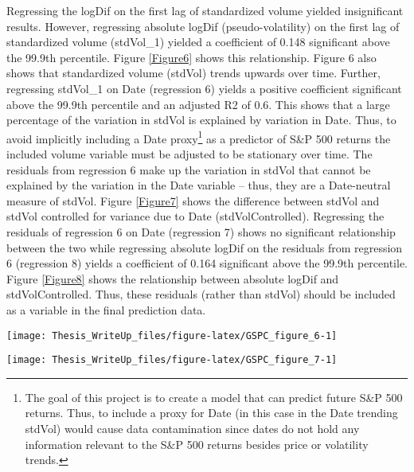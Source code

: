 \documentclass[11pt,preprint, authoryear]{elsarticle}
\let\origfigure\figure
\let\endorigfigure\endfigure
\renewenvironment{figure}[1][2] {
    \expandafter\origfigure\expandafter[H]
} {
    \endorigfigure
}
\numberwithin{equation}{section}
\numberwithin{figure}{section}
\numberwithin{table}{section}
\let\rmarkdownfootnote\footnote%
\def\footnote{\protect\rmarkdownfootnote}
\begin{document}
Regressing the logDif on the first lag of standardized volume yielded
insignificant results. However, regressing absolute logDif
(pseudo-volatility) on the first lag of standardized volume (stdVol\_1)
yielded a coefficient of 0.148 significant above the 99.9th percentile.
Figure \ref{Figure6} shows this relationship. Figure 6 also shows that
standardized volume (stdVol) trends upwards over time. Further,
regressing stdVol\_1 on Date (regression 6) yields a positive
coefficient significant above the 99.9th percentile and an adjusted R2
of 0.6. This shows that a large percentage of the variation in stdVol is
explained by variation in Date. Thus, to avoid implicitly including a
Date proxy\footnote{The goal of this project is to create a model that
  can predict future S\&P 500 returns. Thus, to include a proxy for Date
  (in this case in the Date trending stdVol) would cause data
  contamination since dates do not hold any information relevant to the
  S\&P 500 returns besides price or volatility trends.} as a predictor
of S\&P 500 returns the included volume variable must be adjusted to be
stationary over time. The residuals from regression 6 make up the
variation in stdVol that cannot be explained by the variation in the
Date variable -- thus, they are a Date-neutral measure of stdVol. Figure
\ref{Figure7} shows the difference between stdVol and stdVol controlled
for variance due to Date (stdVolControlled). Regressing the residuals of
regression 6 on Date (regression 7) shows no significant relationship
between the two while regressing absolute logDif on the residuals from
regression 6 (regression 8) yields a coefficient of 0.164 significant
above the 99.9th percentile. Figure \ref{Figure8} shows the relationship
between absolute logDif and stdVolControlled. Thus, these residuals
(rather than stdVol) should be included as a variable in the final
prediction data.

\begin{figure}[H]

{\centering \texttt{[image: Thesis\_WriteUp\_files/figure-latex/GSPC\_figure\_6-1]}

}

\caption{Absolute logDiff and stdVol \label{Figure6}}\label{fig:GSPC_figure_6}
\end{figure}

\begin{figure}[H]

{\centering \texttt{[image: Thesis\_WriteUp\_files/figure-latex/GSPC\_figure\_7-1]}

}

\caption{dateResid of StdVol (Red) and stdVol (Green) \label{Figure7}}\label{fig:GSPC_figure_7}
\end{figure}
\end{document}
